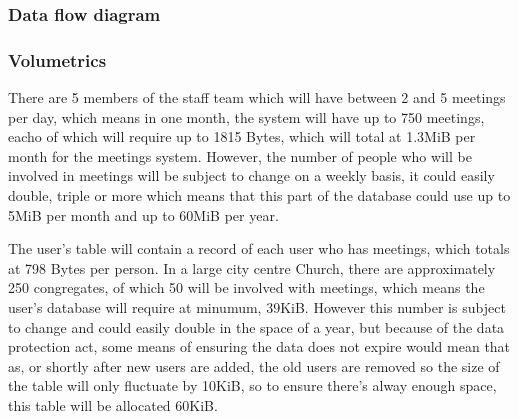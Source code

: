 \subsubsection{Data flow diagram}

\subsubsection{Volumetrics}

	There are 5 members of the staff team which will have between 2 and 5 meetings per day, which means in one month, the system will have up to 750 meetings, eacho of which will require up to 1815 Bytes, which will total at 1.3MiB per month for the meetings system. However, the number of people who will be involved in meetings will be subject to change on a weekly basis, it could easily double, triple or more which means that this part of the database could use up to 5MiB per month and up to 60MiB per year.

	The user's table will contain a record of each user who has meetings, which totals at 798 Bytes per person. In a large city centre Church, there are approximately 250 congregates, of which 50 will be involved with meetings, which means the user's database will require at minumum, 39KiB. However this number is subject to change and could easily double in the space of a year, but because of the data protection act, some means of ensuring the data does not expire would mean that as, or shortly after new users are added, the old users are removed so the size of the table will only fluctuate by \pm10KiB, so to ensure there's alway enough space, this table will be allocated 60KiB.

